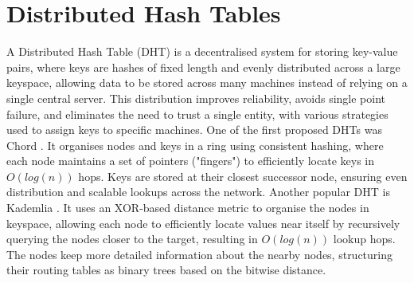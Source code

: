 

\section{Distributed Hash Tables}
A Distributed Hash Table (DHT) is a decentralised system for storing key-value pairs, where keys are hashes of fixed length and evenly distributed across a large keyspace, allowing data to be stored across many machines instead of relying on a single central server. This distribution improves reliability, avoids single point failure, and eliminates the need to trust a single entity, with various strategies used to assign keys to specific machines.
One of the first proposed DHTs was Chord \cite{chord}. It organises nodes and keys in a ring using consistent hashing, where each node maintains a set of pointers ("fingers") to efficiently locate keys in $O(log (n))$ hops. Keys are stored at their closest successor node, ensuring even distribution and scalable lookups across the network.
Another popular DHT is Kademlia \cite{kademlia}. It uses an XOR-based distance metric to organise the nodes in keyspace, allowing each node to efficiently locate values near itself by recursively querying the nodes closer to the target, resulting in $O(log (n))$ lookup hops. The nodes keep more detailed information about the nearby nodes, structuring their routing tables as binary trees based on the bitwise distance.

